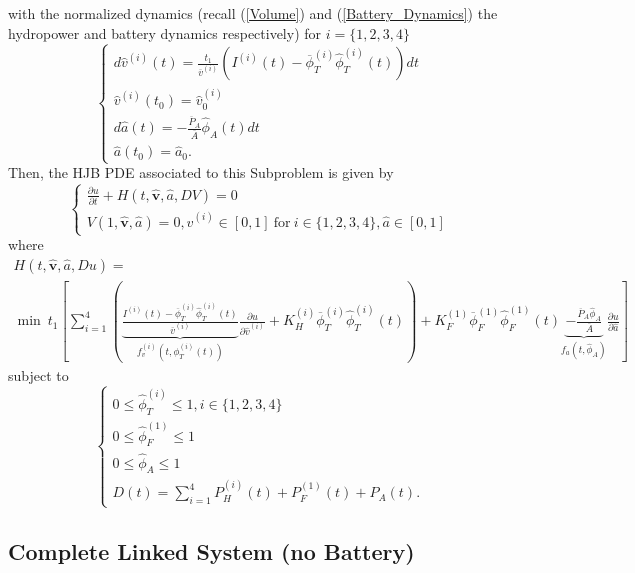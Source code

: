 with the normalized dynamics (recall (\ref{Volume}) and (\ref{Battery_Dynamics}) the hydropower and battery dynamics respectively) for $i=\{1,2,3,4\}$
\begin{equation}
\begin{cases}
d\hat{v}^{(i)}(t)=\frac{t_1}{\overline{v}^{(i)}}\left(I^{(i)}(t)-\overline{\phi}_T^{(i)}\hat{\phi}_T^{(i)}(t)\right)dt\\
\hat{v}^{(i)}(t_0)=\hat{v}_0^{(i)}\\
d\hat{a}(t)=-\frac{\overline{P}_A}{\overline{A}}\hat{\phi}_A(t)dt\\
\hat{a}(t_0)=\hat{a}_0.
\end{cases}
\end{equation}
Then, the HJB PDE associated to this Subproblem is given by
\begin{equation}
\begin{cases}
\frac{\partial u}{\partial t}+H(t,\hat{\bm{v}},\hat{a},DV)=0\\
V(1,\hat{\bm{v}},\hat{a})=0,\hat{v}^{(i)}\in[0,1]\ \text{for}\ i\in\{1,2,3,4\},\hat{a}\in[0,1]
\end{cases}
\end{equation}
where
\begin{multline}
H(t,\hat{\bm{v}},\hat{a},Du)=\\
\min\ t_1\left[\sum_{i=1}^4\left(\underbrace{\frac{I^{(i)}(t)-\overline{\phi}_T^{(i)}\hat{\phi}_T^{(i)}(t)}{\overline{v}^{(i)}}}_{f_v^{(i)}\left(t,\phi_T^{(i)}(t)\right)}\frac{\partial u}{\partial \hat{v}^{(i)}}+K_H^{(i)}\overline{\phi}_T^{(i)}\hat{\phi}_T^{(i)}(t)\right)+K_F^{(1)}\overline{\phi}_F^{(1)}\hat{\phi}_F^{(1)}(t)\underbrace{-\frac{\overline{P}_A\hat{\phi}_A}{\overline{A}}}_{f_a(t,\hat{\phi}_A)}\frac{\partial u}{\partial\hat{a}}\right]
\label{Hamiltonian_5}
\end{multline}
subject to
\begin{equation}
\begin{cases}
0\leq\hat{\phi}^{(i)}_T\leq1,i\in\{1,2,3,4\}\\
0\leq\hat{\phi}^{(1)}_F\leq1\\
0\leq\hat{\phi}_A\leq1\\
D(t)=\sum_{i=1}^4P_H^{(i)}(t)+P_F^{(1)}(t)+P_A(t).
\end{cases}
\end{equation}

\subsection{Complete Linked System (no Battery)} \label{Sixth_Subproblem}

